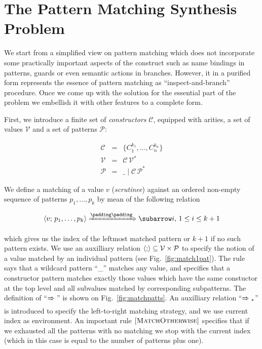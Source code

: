 \section{The Pattern Matching Synthesis Problem}

We start from a simplified view on pattern matching which does not incorporate some practically important aspects of the construct such as
name bindings in patterns, guards or even semantic actions in branches. However, it in a purified form represents the essence of pattern
matching as ``inspect-and-branch'' procedure. Once we come up with the solution for the essential part of the problem we embellish it with
other features to a complete form.

First, we introduce a finite set of \emph{constructors} $\mathcal C$, equipped with arities, a set of values $\mathcal{V}$
and a set of patterns $\mathcal{P}$:
 
\[
 \begin{array}{rcll}
    \mathcal{C} & = & \{ C_1^{k_1}, \dots, C_n^{k_n} \}\\
    \mathcal{V} & = & \mathcal{C}\,\mathcal{V}^*\\  
    \mathcal{P} & = & \_ \mid \mathcal{C}\,\mathcal{P}^*
 \end{array}
\]

We define a matching of a value $v$ (\emph{scrutinee}) against an ordered non-empty sequence of patterns $p_1,\dots,p_k$ by mean of the following
relation

\[
\setarrow{\xRightarrow}
\trans{\inbr{v;\,p_1,\dots,p_k}}{}{i},\,1\le i\le k+1
\]

which gives us the index of the leftmost matched pattern or $k+1$ if no such pattern exists. We use an auxilliary relation $\left<{;}\right>\subseteq\mathcal{V}\times\mathcal{P}$
to specify the notion of a value matched by an individual pattern (see Fig.~\ref{fig:match1pat}). The rule  says that
a wildcard pattern ``\_'' matches any value, and  specifies that a constructor pattern matches exactly those values which
have the same constuctor at the top level and all subvalues matched by corresponding subpatterns. The definition of ``$\xRightarrow{}{}$'' is
shown on Fig.~\ref{fig:matchpatts}. An auxilliary relation ``$\xRightarrow{}{}_*$'' is introduced to specify the left-to-right matching strategy, and we
use current index as environment. An important rule $\mbox{[\textsc{MatchOtherwise}]}$ specifies that if we exhausted all the patterns with no matching we stop with
the current index (which in this case is equal to the number of patterns plus one).

